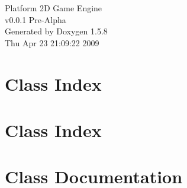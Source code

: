 \documentclass[a4paper]{book}
\begin{document}
\begin{titlepage}
\vspace*{7cm}
\begin{center}
{\Large Platform 2D Game Engine \\[1ex]\large v0.0.1 Pre-Alpha }\\
\vspace*{1cm}
{\large Generated by Doxygen 1.5.8}\\
\vspace*{0.5cm}
{\small Thu Apr 23 21:09:22 2009}\\
\end{center}
\end{titlepage}
\clearemptydoublepage
{}
\tableofcontents
\clearemptydoublepage
{}
\chapter{Class Index}

\chapter{Class Index}

\chapter{Class Documentation}






\printindex
\end{document}
